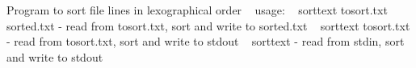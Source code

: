 Program to sort file lines in lexographical order ~\newline
usage\+: ~\newline
sorttext tosort.\+txt sorted.\+txt -\/ read from tosort.\+txt, sort and write to sorted.\+txt ~\newline
sorttext tosort.\+txt -\/ read from tosort.\+txt, sort and write to stdout ~\newline
sorttext -\/ read from stdin, sort and write to stdout ~\newline
